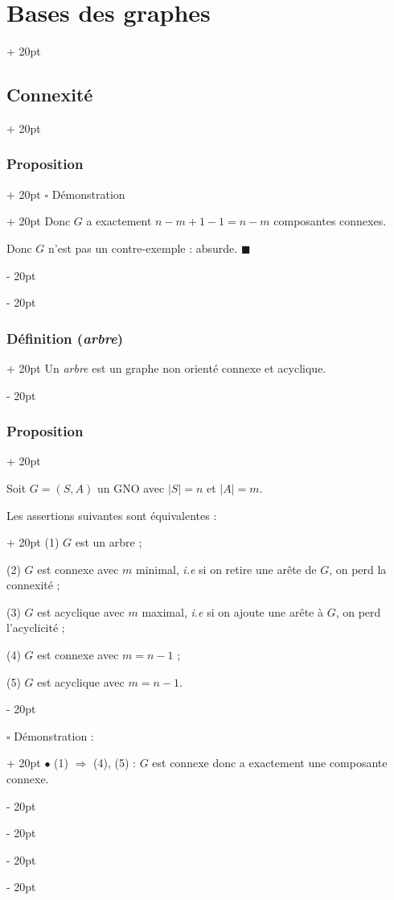 \documentclass[a4paper, 12pt, twoside]{article}
\newcommand{\abs}[1]{\left\lvert #1 \right\rvert}
\newcommand{\ind}[1][20pt]{\advance\leftskip + #1}
\newcommand{\deind}[1][20pt]{\advance\leftskip - #1}
\newenvironment{indt}[2][20pt]{#2 \par \ind[#1]}{\par \deind} %
\begin{document}
\begin{indt}{\section{Bases des graphes}}
\begin{indt}{\subsection{Connexité}}
\begin{indt}{\subsubsection{Proposition}}
\begin{indt}{$\square$ Démonstration}
                    Donc $G$ a exactement $n - m + 1 - 1 = n - m$ composantes connexes.

                    Donc $G$ n'est pas un contre-exemple : absurde. $\blacksquare$
                \end{indt}
            \end{indt}

            \vspace{12pt}
            
            \begin{indt}{\subsubsection{Définition (\textit{arbre})}}
                Un \textit{arbre} est un graphe non orienté connexe et acyclique.
            \end{indt}

            \vspace{12pt}
            
            \begin{indt}{\subsubsection{Proposition}}
                \label{2.2.14}
                
                Soit $G = (S, A)$ un GNO avec $\abs S = n$ et $\abs A = m$.

                \begin{indt}{Les assertions suivantes sont équivalentes :}
                    (1) $G$ est un arbre ;

                    (2) $G$ est connexe avec $m$ minimal, \textit{i.e} si on retire une arête de $G$, on perd la connexité ;

                    (3) $G$ est acyclique avec $m$ maximal, \textit{i.e} si on ajoute une arête à $G$, on perd l'acyclicité ;

                    (4) $G$ est connexe avec $m = n - 1$ ;

                    (5) $G$ est acyclique avec $m = n - 1$.
                \end{indt}

                \vspace{12pt}
                
                \begin{indt}{$\square$ Démonstration :}
                    $\bullet$ (1) $\Rightarrow$ (4), (5) : $G$ est connexe donc a exactement une composante connexe.


\end{indt}
\end{indt}
\end{indt}
\end{indt}
\end{document}
